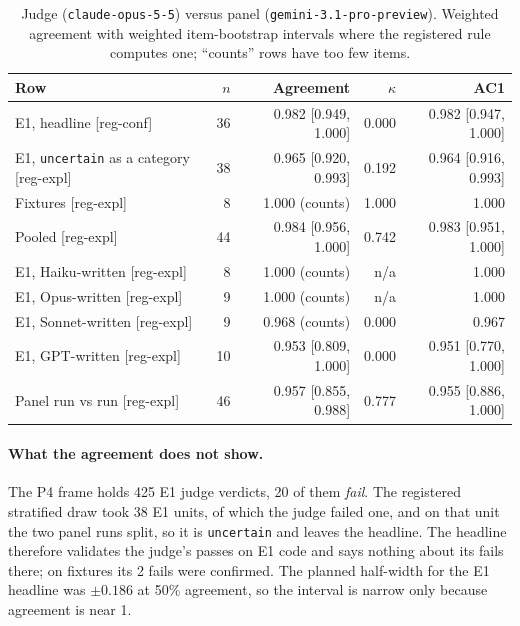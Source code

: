 \documentclass[10pt,a4paper]{article}
\newcommand{\regC}{\textsf{\scriptsize[reg-conf]}}  %
\newcommand{\regX}{\textsf{\scriptsize[reg-expl]}}  %
\begin{document}
\begin{table}[t]
\centering\small
\setlength{\tabcolsep}{4pt}
\caption{Judge (\texttt{claude-opus-5-5}) versus panel (\texttt{gemini-3.1-pro-preview}). Weighted agreement with
weighted item-bootstrap intervals where the registered rule computes one; ``counts'' rows have too few items.}
\label{tab:p4}
\begin{tabular}{@{}lrrrr@{}}
\toprule
Row & $n$ & Agreement & $\kappa$ & AC1 \\
\midrule
E1, headline \regC{}                      & 36 & 0.982 [0.949, 1.000] & 0.000 & 0.982 [0.947, 1.000] \\
E1, \texttt{uncertain} as a category \regX{} & 38 & 0.965 [0.920, 0.993] & 0.192 & 0.964 [0.916, 0.993] \\
Fixtures \regX{}                           & 8  & 1.000 (counts) & 1.000 & 1.000 \\
Pooled \regX{}                             & 44 & 0.984 [0.956, 1.000] & 0.742 & 0.983 [0.951, 1.000] \\
\midrule
E1, Haiku-written \regX{}                  & 8  & 1.000 (counts) & n/a & 1.000 \\
E1, Opus-written \regX{}                   & 9  & 1.000 (counts) & n/a & 1.000 \\
E1, Sonnet-written \regX{}                 & 9  & 0.968 (counts) & 0.000 & 0.967 \\
E1, GPT-written \regX{}                    & 10 & 0.953 [0.809, 1.000] & 0.000 & 0.951 [0.770, 1.000] \\
Panel run vs run \regX{}                   & 46 & 0.957 [0.855, 0.988] & 0.777 & 0.955 [0.886, 1.000] \\
\bottomrule
\end{tabular}
\end{table}

\paragraph{What the agreement does not show.} The P4 frame holds 425 E1 judge verdicts, 20 of them \emph{fail}.
The registered stratified draw took 38 E1 units, of which the judge failed one, and on that unit the two panel runs
split, so it is \texttt{uncertain} and leaves the headline. %
The headline therefore validates the judge's passes on E1 code and says nothing about its fails there; on fixtures its
2 fails were confirmed. The planned half-width for the E1 headline was $\pm 0.186$ at 50\% agreement, so the interval
is narrow only because agreement is near 1. %
\end{document}
